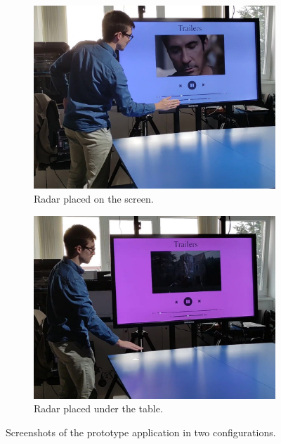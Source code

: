 \begin{figure}[t]
\centering
\begin{subfigure}{.49\textwidth}
    \centering
    \includegraphics[width=\linewidth]{Figures/RadarChallenges/Application/app-screen-2.pdf}  
    \vspace{-15pt}
    \captionsetup{width=.9\linewidth}
    \caption{Radar placed on the screen.}
    \label{fig:radar-challenges:screen}
\end{subfigure}
\begin{subfigure}{.49\textwidth}
    \centering
    \includegraphics[width=\linewidth]{Figures/RadarChallenges/Application/app-table-2.pdf}  
    \vspace{-15pt}
    \captionsetup{width=.9\linewidth}
    \caption{Radar placed under the table.}
    \label{fig:radar-challenges:application:table}
\end{subfigure}
\vspace{-8pt}
\caption{Screenshots of the prototype application in two configurations.}
\label{fig:radar-challenges:application}
\end{figure}

